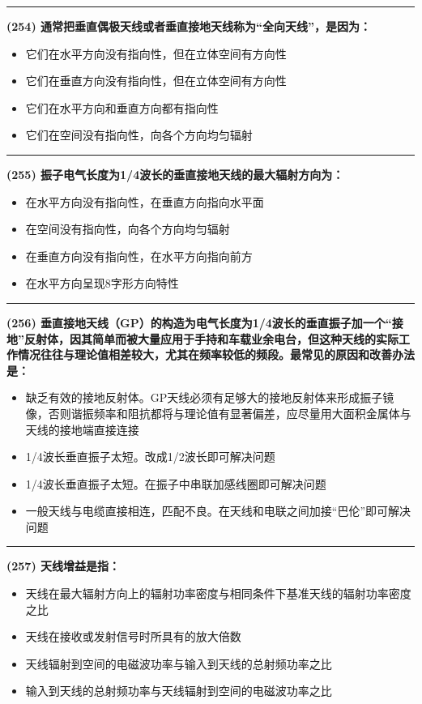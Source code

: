 \documentclass[twocolumn]{ctexart}  %
\begin{document}
\noindent\rule{0.5\textwidth}{1pt}
\heiti \textbf{(254) 通常把垂直偶极天线或者垂直接地天线称为“全向天线”，是因为：} \songti {\color{gray} [LK0918] }
\begin{itemize}
	\item  它们在水平方向没有指向性，但在立体空间有方向性
	\item  它们在垂直方向没有指向性，但在立体空间有方向性
	\item  它们在水平方向和垂直方向都有指向性
	\item  它们在空间没有指向性，向各个方向均匀辐射
\end{itemize}


\noindent\rule{0.5\textwidth}{1pt}
\heiti \textbf{(255) 振子电气长度为1/4波长的垂直接地天线的最大辐射方向为：} \songti {\color{gray} [LK0919] }
\begin{itemize}
	\item  在水平方向没有指向性，在垂直方向指向水平面
	\item  在空间没有指向性，向各个方向均匀辐射
	\item  在垂直方向没有指向性，在水平方向指向前方
	\item  在水平方向呈现8字形方向特性
\end{itemize}


\noindent\rule{0.5\textwidth}{1pt}
\heiti \textbf{(256) 垂直接地天线（GP）的构造为电气长度为1/4波长的垂直振子加一个“接地”反射体，因其简单而被大量应用于手持和车载业余电台，但这种天线的实际工作情况往往与理论值相差较大，尤其在频率较低的频段。最常见的原因和改善办法是：} \songti {\color{gray} [LK0925] }
\begin{itemize}
	\item  缺乏有效的接地反射体。GP天线必须有足够大的接地反射体来形成振子镜像，否则谐振频率和阻抗都将与理论值有显著偏差，应尽量用大面积金属体与天线的接地端直接连接
	\item  1/4波长垂直振子太短。改成1/2波长即可解决问题
	\item  1/4波长垂直振子太短。在振子中串联加感线圈即可解决问题
	\item  一般天线与电缆直接相连，匹配不良。在天线和电联之间加接“巴伦”即可解决问题
\end{itemize}


\noindent\rule{0.5\textwidth}{1pt}
\heiti \textbf{(257) 天线增益是指：} \songti {\color{gray} [LK0926] }
\begin{itemize}
	\item  天线在最大辐射方向上的辐射功率密度与相同条件下基准天线的辐射功率密度之比
	\item  天线在接收或发射信号时所具有的放大倍数
	\item  天线辐射到空间的电磁波功率与输入到天线的总射频功率之比
	\item  输入到天线的总射频功率与天线辐射到空间的电磁波功率之比
\end{itemize}
\end{document}
